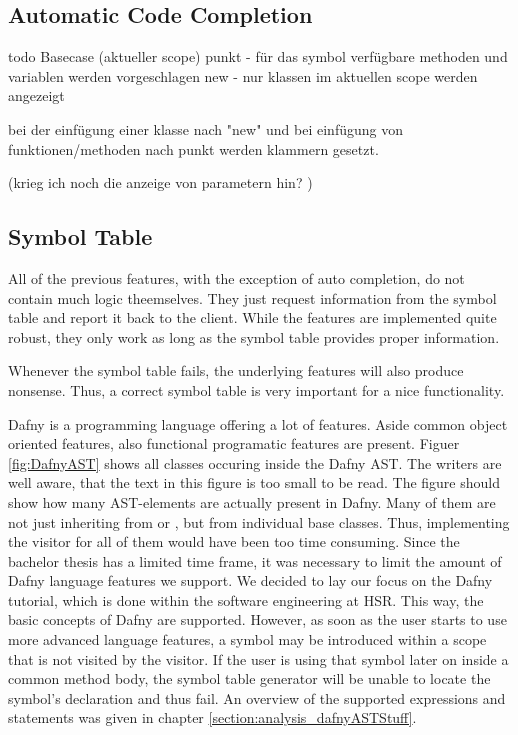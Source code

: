 \subsection{Automatic Code Completion}
todo
Basecase (aktueller scope)
punkt - für das symbol verfügbare methoden und variablen werden vorgeschlagen
new - nur klassen im aktuellen scope werden angezeigt

bei der einfügung einer klasse nach "new" und bei einfügung von funktionen/methoden nach punkt werden klammern gesetzt.

(krieg ich noch die anzeige von parametern hin? )

\subsection{Symbol Table}
All of the previous features, with the exception of auto completion, do not contain much logic theemselves.
They just request information from the symbol table and report it back to the client.
While the features are implemented quite robust, they only work as long as the symbol table provides proper information.

Whenever the symbol table fails, the underlying features will also produce nonsense.
Thus, a correct symbol table is very important for a nice functionality.

Dafny is a programming language offering a lot of features.
Aside common object oriented features, also functional programatic features are present.
Figuer \ref{fig:DafnyAST} shows all classes occuring inside the Dafny AST.
The writers are well aware, that the text in this figure is too small to be read.
The figure should  show how many AST-elements are actually present in Dafny.
Many of them are not just inheriting from  or , but from individual base classes.
Thus, implementing the visitor for all of them would have been too time consuming.
Since the bachelor thesis has a limited time frame, it was necessary to limit the amount of Dafny language features we support.
We decided to lay our focus on the Dafny tutorial, which is done within the software engineering at HSR.
This way, the basic concepts of Dafny are supported.
However, as soon as the user starts to use more advanced language features, a symbol may be introduced within a scope that is not visited by the visitor.
If the user is using that symbol later on inside a common method body, the symbol table generator will be unable to locate the symbol's declaration and thus fail.
An overview of the supported expressions and statements was given in chapter \ref{section:analysis_dafnyASTStuff}.

